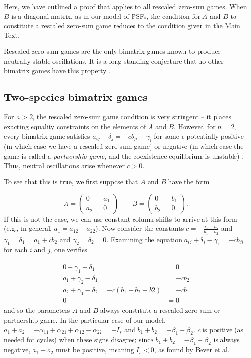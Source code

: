 \documentclass[11pt]{article}
\begin{document}
Here, we have outlined a proof that applies to all rescaled zero-sum games. When $B$ is a diagonal matrix, as in our model of PSFs, the condition for $A$ and $B$ to constitute a rescaled zero-sum game reduces to the condition given in the Main Text.

Rescaled zero-sum games are the only bimatrix games known to produce neutrally stable oscillations. It is a long-standing conjecture that no other bimatrix games have this property \cite{hofbauer1996evolutionary,hofbauer1998evolutionary,hofbauer2011deterministic}. 

\subsection{Two-species bimatrix games}

For $n > 2$, the rescaled zero-sum game condition is very stringent -- it places exacting equality constraints on the elements of $A$ and $B$. However, for $n = 2$, every bimatrix game satisfies $a_{ij} + \delta_j = -c b_{ji} + \gamma_i$ for some $c$ potentially positive (in which case we have a rescaled zero-sum game) or negative (in which case the game is called a \emph{partnership game}, and the coexistence equilibrium is unstable) \cite{hofbauer1998evolutionary}. Thus, neutral oscillations arise whenever $c > 0$. 

To see that this is true, we first suppose that $A$ and $B$ have the form

\begin{equation}
	A = \begin{pmatrix}
	0 && a_1 \\
	a_2 && 0
	\end{pmatrix}
	\quad \quad 
	B = \begin{pmatrix}
	0 && b_1 \\
	b_2 && 0 
	\end{pmatrix} \, . 
\end{equation}
If this is not the case, we can use constant column shifts to arrive at this form (e.g., in general, $a_1 = a_{12} - a_{22}$). Now consider the constants $c = -\frac{a_1 + a_2}{b_1 + b_2}$ and $\gamma_1 = \delta_1 = a_1 + c b_2$ and $\gamma_2 = \delta_2 = 0$. Examining the equation $a_{ij} + \delta_j - \gamma_i = -c b_{ji}$ for each $i$ and $j$, one verifies

\begin{align}
	\begin{split}
	0 + \gamma_1 - \delta_1  &= 0 \\
	a_1 + \gamma_2 - \delta_1 &= -c b_2 \\
	a_2 + \gamma_1 - \delta_2 = -c (b_1 + b_2 - b2) &= -c b_1 \\
	0  &= 0
	\end{split}
\end{align}
and so the parameters $A$ and $B$ always constitute a rescaled zero-sum or partnership game. In the particular case of our model, $a_1 + a_2 = -\alpha_{11} + \alpha_{21} + \alpha_{12} - \alpha_{22} = -I_s$ and $b_1 + b_2 = -\beta_1 - \beta_2$. $c$ is positive (as needed for cycles) when these signs disagree; since $b_1 + b_2 = -\beta_1 - \beta_2$ is always negative, $a_1 + a_2$ must be positive, meaning $I_s < 0$, as found by Bever et al.
\end{document}
